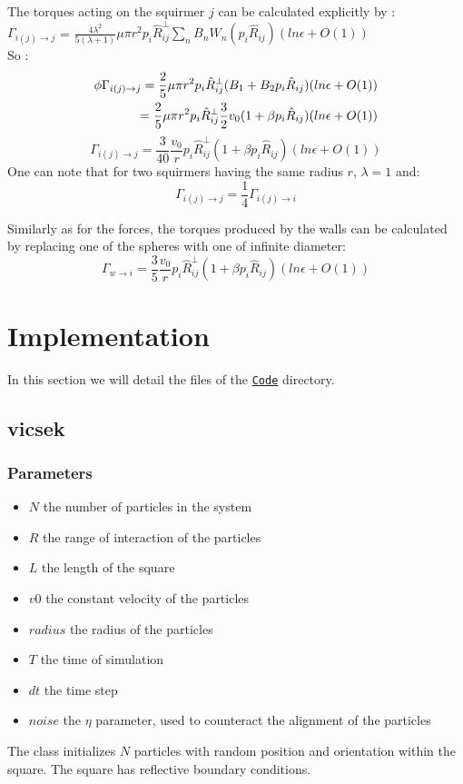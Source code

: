 \documentclass{article}
\begin{document}
The torques acting on the squirmer $j$ can be calculated explicitly by : \\
$\Gamma_{i(j)\rightarrow j}$ = $\frac{4 \lambda^2}{5(\lambda +1)} \mu \pi r^2 p_i\hat{R}_{ij}^{\perp}\sum_{n} B_n W_n(p_i\hat{R}_{ij}) (ln \epsilon + O(1))$ \cite{Brumley}
\\ So :
\begin{align*}
    \footnotesize
    \phi \Gamma_{i(j)\rightarrow j} = \frac{2}{5}\mu\pi r^2p_i\hat{R}_{ij}^{\perp}(B_1 + B_2 p_i\hat{R}_{ij})(ln \epsilon + O(1))\\
    = \frac{2}{5}\mu\pi r^2p_i\hat{R}_{ij}^{\perp}\frac{3}{2}v_0(1 + \beta p_i\hat{R}_{ij})(ln \epsilon + O(1))
\end{align*}
\begin{equation*}
    \boxed{\Gamma_{i(j)\rightarrow j} = \frac{3}{40}\frac{v_0}{r}p_i\hat{R}_{ij}^{\perp}(1 + \beta p_i\hat{R}_{ij})(ln \epsilon + O(1))}
\end{equation*}
One can note that for two squirmers having the same radius $r$, $\lambda = 1$ and:
$$\Gamma_{i(j)\rightarrow j} = \frac{1}{4}\Gamma_{i(j)\rightarrow i}$$

Similarly as for the forces, the torques produced by the walls can be calculated by replacing one of the spheres with one of infinite diameter:
\begin{equation*}
    \boxed{\Gamma_{w\rightarrow i} = \frac{3}{5} \frac{v_0}{r}p_i\hat{R}_{ij}^{\perp}(1 + \beta p_i\hat{R}_{ij})(ln \epsilon + O(1))}
\end{equation*}



\section{Implementation}
In this section we will detail the files of the \texttt{\href{https://github.com/master-csmi/2024-m1-nemo/tree/main/Code}{Code}} directory.
\subsection{vicsek}
\subsubsection*{Parameters}
\begin{itemize}
    \item $N$ the number of particles in the system
    \item $R$ the range of interaction of the particles
    \item $L$ the length of the square
    \item $v0$ the constant velocity of the particles
    \item $radius$ the radius of the particles
    \item $T$ the time of simulation
    \item $dt$ the time step
    \item $noise$ the $\eta$ parameter, used to counteract the alignment of the particles
\end{itemize}
The class initializes $N$ particles with random position and orientation within the square. The square has reflective boundary conditions.
\end{document}
